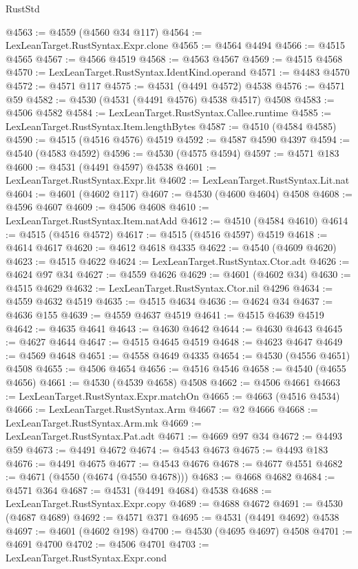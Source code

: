 \begin{lexlean}{RustStd}
\begin{coremodule}
{\begin{coremodule}
{{{{{{{{{{{{{{{{{{{{{{{{{{{{{{{{{{{{{{{{{{{{{{{{{{{{{{{@4563 := @4559 (@4560 @34 @117)
@4564 := LexLeanTarget.RustSyntax.Expr.clone
@4565 := @4564 @4494
@4566 := @4515 @4565
@4567 := @4566 @4519
@4568 := @4563 @4567
@4569 := @4515 @4568
@4570 := LexLeanTarget.RustSyntax.IdentKind.operand
@4571 := @4483 @4570
@4572 := @4571 @117
@4575 := @4531 (@4491 @4572) @4538
@4576 := @4571 @59
@4582 := @4530 (@4531 (@4491 @4576) @4538 @4517) @4508
@4583 := @4506 @4582
@4584 := LexLeanTarget.RustSyntax.Callee.runtime
@4585 := LexLeanTarget.RustSyntax.Item.lengthBytes
@4587 := @4510 (@4584 @4585)
@4590 := @4515 (@4516 @4576) @4519
@4592 := @4587 @4590 @4397
@4594 := @4540 (@4583 @4592)
@4596 := @4530 (@4575 @4594)
@4597 := @4571 @183
@4600 := @4531 (@4491 @4597) @4538
@4601 := LexLeanTarget.RustSyntax.Expr.lit
@4602 := LexLeanTarget.RustSyntax.Lit.nat
@4604 := @4601 (@4602 @117)
@4607 := @4530 (@4600 @4604) @4508
@4608 := @4596 @4607
@4609 := @4506 @4608
@4610 := LexLeanTarget.RustSyntax.Item.natAdd
@4612 := @4510 (@4584 @4610)
@4614 := @4515 (@4516 @4572)
@4617 := @4515 (@4516 @4597) @4519
@4618 := @4614 @4617
@4620 := @4612 @4618 @4335
@4622 := @4540 (@4609 @4620)
@4623 := @4515 @4622
@4624 := LexLeanTarget.RustSyntax.Ctor.adt
@4626 := @4624 @97 @34
@4627 := @4559 @4626
@4629 := @4601 (@4602 @34)
@4630 := @4515 @4629
@4632 := LexLeanTarget.RustSyntax.Ctor.nil @4296
@4634 := @4559 @4632 @4519
@4635 := @4515 @4634
@4636 := @4624 @34
@4637 := @4636 @155
@4639 := @4559 @4637 @4519
@4641 := @4515 @4639 @4519
@4642 := @4635 @4641
@4643 := @4630 @4642
@4644 := @4630 @4643
@4645 := @4627 @4644
@4647 := @4515 @4645 @4519
@4648 := @4623 @4647
@4649 := @4569 @4648
@4651 := @4558 @4649 @4335
@4654 := @4530 (@4556 @4651) @4508
@4655 := @4506 @4654
@4656 := @4516 @4546
@4658 := @4540 (@4655 @4656)
@4661 := @4530 (@4539 @4658) @4508
@4662 := @4506 @4661
@4663 := LexLeanTarget.RustSyntax.Expr.matchOn
@4665 := @4663 (@4516 @4534)
@4666 := LexLeanTarget.RustSyntax.Arm
@4667 := @2 @4666
@4668 := LexLeanTarget.RustSyntax.Arm.mk
@4669 := LexLeanTarget.RustSyntax.Pat.adt
@4671 := @4669 @97 @34
@4672 := @4493 @59
@4673 := @4491 @4672
@4674 := @4543 @4673
@4675 := @4493 @183
@4676 := @4491 @4675
@4677 := @4543 @4676
@4678 := @4677 @4551
@4682 := @4671 (@4550 (@4674 (@4550 @4678)))
@4683 := @4668 @4682
@4684 := @4571 @364
@4687 := @4531 (@4491 @4684) @4538
@4688 := LexLeanTarget.RustSyntax.Expr.copy
@4689 := @4688 @4672
@4691 := @4530 (@4687 @4689)
@4692 := @4571 @371
@4695 := @4531 (@4491 @4692) @4538
@4697 := @4601 (@4602 @198)
@4700 := @4530 (@4695 @4697) @4508
@4701 := @4691 @4700
@4702 := @4506 @4701
@4703 := LexLeanTarget.RustSyntax.Expr.cond
}}}}}}}}}}}}}}}}}}}}}}}}}}}}}}}}}}}}}}}}}}}}}}}}}}}}}}}
\end{coremodule}}
\end{coremodule}
\end{lexlean}
